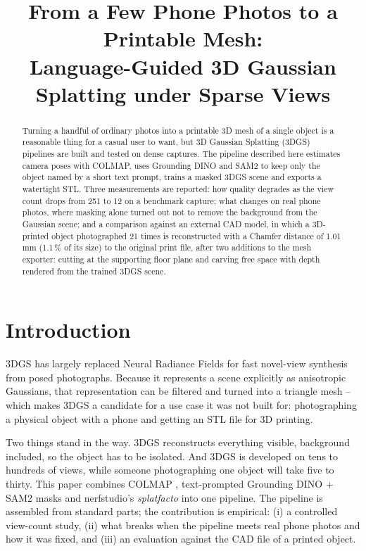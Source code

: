 \documentclass[conference]{IEEEtran}
\begin{document}
\title{From a Few Phone Photos to a Printable Mesh:\\Language-Guided 3D Gaussian Splatting under Sparse Views}

\author{
}

\maketitle

\begin{abstract}
Turning a handful of ordinary photos into a printable 3D mesh of a single object is a reasonable thing for a casual user to want, but 3D Gaussian Splatting (3DGS) pipelines are built and tested on dense captures. The pipeline described here estimates camera poses with COLMAP, uses Grounding DINO and SAM2 to keep only the object named by a short text prompt, trains a masked 3DGS scene and exports a watertight STL. Three measurements are reported: how quality degrades as the view count drops from 251 to 12 on a benchmark capture; what changes on real phone photos, where masking alone turned out not to remove the background from the Gaussian scene; and a comparison against an external CAD model, in which a 3D-printed object photographed 21 times is reconstructed with a Chamfer distance of 1.01\,mm (1.1\,\% of its size) to the original print file, after two additions to the mesh exporter: cutting at the supporting floor plane and carving free space with depth rendered from the trained 3DGS scene.
\end{abstract}

\section{Introduction}

3DGS \cite{kerbl20233dgs} has largely replaced Neural Radiance Fields \cite{mildenhall2020nerf} for fast novel-view synthesis from posed photographs. Because it represents a scene explicitly as anisotropic Gaussians, that representation can be filtered and turned into a triangle mesh -- which makes 3DGS a candidate for a use case it was not built for: photographing a physical object with a phone and getting an STL file for 3D printing.

Two things stand in the way. 3DGS reconstructs everything visible, background included, so the object has to be isolated. And 3DGS is developed on tens to hundreds of views, while someone photographing one object will take five to thirty. This paper combines COLMAP \cite{schoenberger2016sfm}, text-prompted Grounding DINO \cite{liu2023groundingdino} + SAM2 \cite{ravi2024sam2} masks and nerfstudio's \emph{splatfacto} \cite{tancik2023nerfstudio} into one pipeline. The pipeline is assembled from standard parts; the contribution is empirical: (i) a controlled view-count study, (ii) what breaks when the pipeline meets real phone photos and how it was fixed, and (iii) an evaluation against the CAD file of a printed object.
\end{document}
